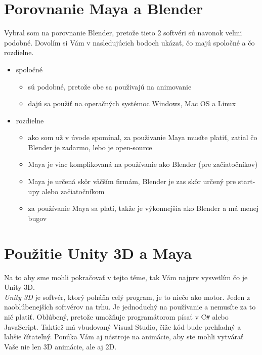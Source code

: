 \documentclass[10pt,oneside,slovak,a4paper]{article}
\begin{document}
\section{Porovnanie Maya a Blender} \label{porovnanie}

Vybral som na porovnanie Blender, pretože tieto 2 softvéri sú navonok veľmi podobné. Dovolím si Vám v nasledujúcich bodoch ukázať, čo majú spoločné a čo rozdielne.

\begin{itemize}
\item spoločné
	\begin{itemize}
	\item sú podobné, pretože obe sa použivajú na animovanie
	\item dajú sa použiť na operačných systémoc Windows, Mac OS a Linux
	\end{itemize}

\item rozdielne
	\begin{itemize}
	\item ako som už v úvode spomínal, za použivanie Maya musíte platiť, zatial čo Blender je zadarmo, lebo je open-source
	\item Maya je viac komplikovaná na používanie ako Blender (pre začiatočníkov)
	\item Maya je určená skôr väčším firmám, Blender je zas skôr určený pre start-upy alebo začiatočníkom
	\item za používanie Maya sa platí, takže je výkonnejšia ako Blender a má menej bugov\cite{educba2021}
	\end{itemize}
\end{itemize}



\section{Použitie Unity 3D a Maya} \label{3d}

Na to aby sme mohli pokračovať v tejto téme, tak Vám najprv vysvetlím čo je Unity 3D.\\

\emph{Unity 3D} je softvér, ktorý poháňa celý program, je to niečo ako motor. Jeden z naoblúbenejších softvérov na trhu. Je jednoduchý na používanie a nemusíte za to nič platiť. Oblúbený, pretože umožňuje programátorom písať v C\texttt{\#} alebo JavaScript. Taktiež má vbudovaný Visual Studio, čiže kód bude prehľadný a ľahšie čítateľný. Ponúka Vám aj nástroje na animácie, aby ste mohli vytvárať Vaše nie len 3D animácie, ale aj 2D.\\
\end{document}
